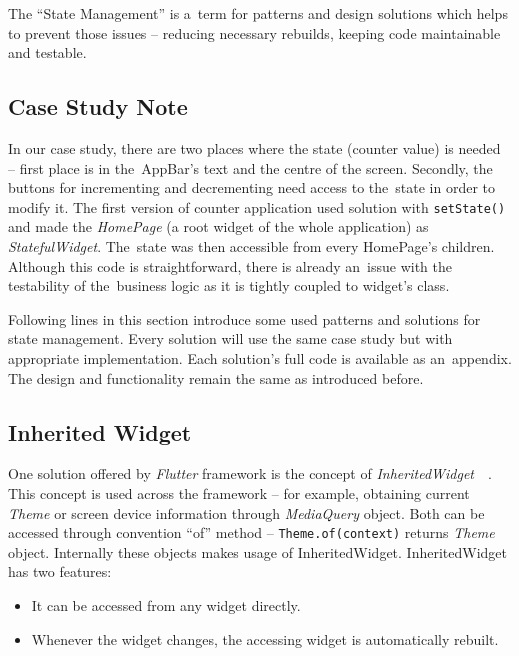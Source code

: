 The ``State Management'' is a~term for patterns and design solutions which helps to prevent those issues -- reducing necessary rebuilds, keeping code maintainable and testable. 
\subsection{Case Study Note}
In our case study, there are two places where the state (counter value) is needed -- first place is in the~AppBar's text and the centre of the screen. Secondly, the buttons for incrementing and decrementing need access to the~state in order to modify it. The first version of counter application used solution with \verb|setState()| and made the \textit{HomePage} (a root widget of the whole application) as \textit{StatefulWidget}. The~state was then accessible from every HomePage's children. Although this code is straightforward, there is already an~issue with the testability of the~business logic as it is tightly coupled to widget's class.  

Following lines in this section introduce some used patterns and solutions for state management.  Every solution will use the same case study but with appropriate implementation. Each solution's full code is available as an~appendix. The design and functionality remain the same as introduced before.
\subsection{Inherited Widget}
One solution offered by \textit{Flutter} framework is the concept of \textit{InheritedWidget}~\cite{flutter-inherited-widget}~\cite{notion-widget-didier}. This concept is used across the framework -- for example, obtaining current \textit{Theme} or screen device information through \textit{MediaQuery} object. Both can be accessed through convention ``of'' method -- \verb|Theme.of(context)| returns \textit{Theme} object. Internally these objects makes usage of InheritedWidget. InheritedWidget has two features:

\begin{itemize}
    \item It can be accessed from any widget directly.
    \item Whenever the widget changes, the accessing widget is automatically rebuilt.
\end{itemize}

